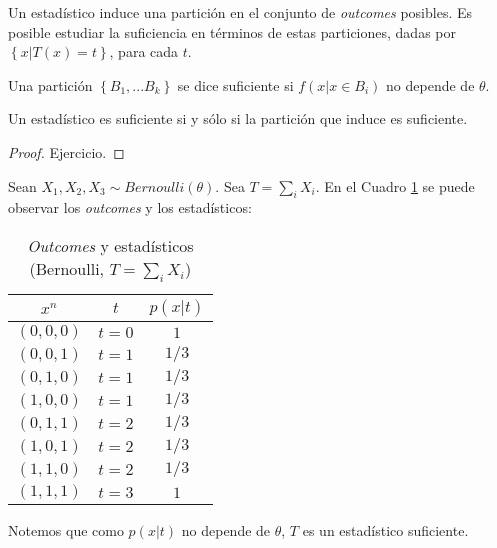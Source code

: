 Un estadístico induce una partición en el conjunto de \emph{outcomes}  posibles. Es posible estudiar la suficiencia en términos de estas particiones, dadas por $\left \{ x | T(x) = t \right  \}$, para cada $ t $. 

\begin{definition}
    Una partición $ \left \{ B_1,...B_k \right \}$ se dice suficiente si $f(x | x \in B_i) $ no depende de $\theta$. 
\end{definition}
\begin{theorem}
    Un estadístico es suficiente si y sólo si la partición que induce es suficiente.
\end{theorem}
\begin{proof}
Ejercicio. 
\end{proof}

\begin{example}
Sean $X_1,X_2, X_3\sim Bernoulli(\theta)$. Sea $T= \sum_{i} X_i$. En el Cuadro \ref{tab: Part.Bernoulli suficiente} se puede observar los \emph{outcomes} y los estadísticos: 
\newpage
\begin{table}[h]
    \centering
    \begin{tabular}{c  c  c}  
        $x^{n} $  & $t$  & $ p(x|t) $\\ \hline
        $ (0,0,0) $ & $t=0$ & $1$ \\  \hline
       $ (0,0,1) $ & $t=1$ & $1/3$   \\
        $ (0,1,0) $ & $t=1$ & $1/3$ \\
        $ (1,0,0) $  & $t=1$ & $1/3$ \\ \hline 
        $ (0,1,1) $ & $t=2$ & $1/3$   \\
        $ (1,0,1) $ & $t=2$ & $1/3$ \\
        $ (1,1,0) $  & $t=2$ & $1/3$ \\ \hline 
        $ (1,1,1) $ & $t=3$ & $1$ \\
        
        
    \end{tabular}
    \caption{\emph{Outcomes} y estadísticos (Bernoulli, $T= \sum_{i} X_i$)  }
    \label{tab: Part.Bernoulli suficiente}
\end{table}
Notemos que como $p(x | t )$ no depende de $\theta$, $T$ es un estadístico suficiente. 
\end{example}


